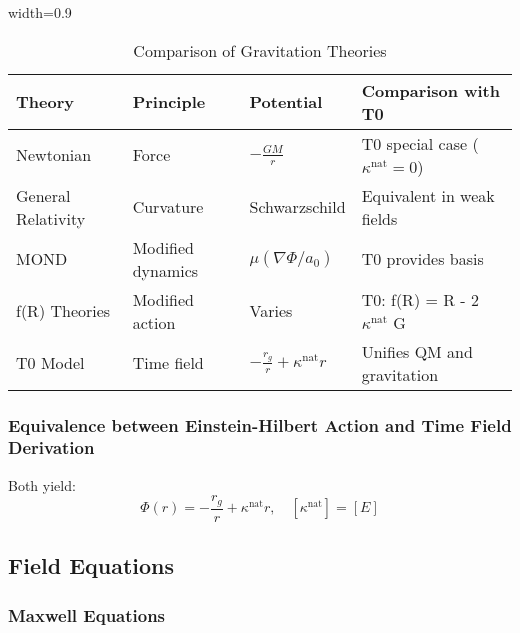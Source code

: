 \documentclass[12pt,a4paper]{article}
\newcommand{\tablescale}{0.9}
\begin{document}
	\begin{table}[htbp]
		\centering
		\begin{adjustbox}{width=\tablescale\textwidth}
			\begin{tabular}{p{3cm}p{3cm}p{4cm}p{4cm}}
				\toprule
				\textbf{Theory} & \textbf{Principle} & \textbf{Potential} & \textbf{Comparison with T0} \\
				\midrule
				Newtonian & Force & \(-\frac{G M}{r}\) & T0 special case (\(\kappa^{\text{nat}} = 0\)) \\
				General Relativity & Curvature & Schwarzschild & Equivalent in weak fields \\
				MOND & Modified dynamics & \(\mu(\nabla \Phi/a_0)\) & T0 provides basis \\
				f(R) Theories & Modified action & Varies & T0: f(R) = R - 2\(\kappa^{\text{nat}}\) G \\
				T0 Model & Time field & \(-\frac{r_g}{r} + \kappa^{\text{nat}} r\) & Unifies QM and gravitation \\
				\bottomrule
			\end{tabular}
		\end{adjustbox}
		\caption{Comparison of Gravitation Theories}
		\label{tab:theory_comparison}
	\end{table}
	
	\subsubsection{Equivalence between Einstein-Hilbert Action and Time Field Derivation}
	Both yield:
	\[
	\Phi(r) = -\frac{r_g}{r} + \kappa^{\text{nat}} r, \quad [\kappa^{\text{nat}}] = [E]
	\]
	
	\subsection{Field Equations}
	\label{sec:field_equations}
	
	\subsubsection{Maxwell Equations}
	\label{subsec:maxwell}
	
\end{document}
